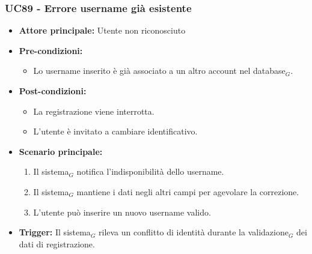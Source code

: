 \documentclass[a4paper, 10pt]{article}
\begin{document}
\subsubsection{UC89 - Errore username già esistente}
\hypertarget{uc:89}{}
\begin{itemize}
    \item \textbf{Attore principale:} Utente non riconosciuto
    \item \textbf{Pre-condizioni:} 
        \begin{itemize}
            \item Lo username inserito è già associato a un altro account nel database$_G$.
        \end{itemize}
    \item \textbf{Post-condizioni:} 
        \begin{itemize}
            \item La registrazione viene interrotta.
            \item L'utente è invitato a cambiare identificativo.
        \end{itemize}
    \item \textbf{Scenario principale:}
        \begin{enumerate}
            \item Il sistema$_G$ notifica l'indisponibilità dello username.
            \item Il sistema$_G$ mantiene i dati negli altri campi per agevolare la correzione.
            \item L'utente può inserire un nuovo username valido.
        \end{enumerate}
    \item \textbf{Trigger:} Il sistema$_G$ rileva un conflitto di identità durante la validazione$_G$ dei dati di registrazione.
\end{itemize}
\end{document}
